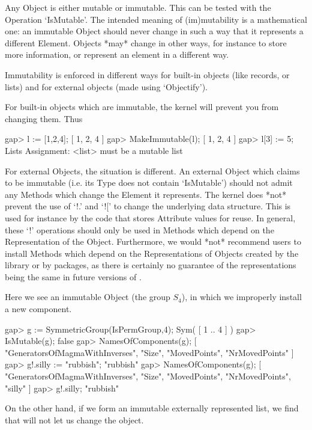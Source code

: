
Any {\GAP} Object is either mutable or immutable. This can be tested
with the Operation `IsMutable'. The intended meaning of (im)mutability
is a mathematical one:  an immutable Object should never change in
such a way that it represents a different Element. Objects *may*
change in other ways, for instance to store more information, or
represent an element in a different way.

Immutability is enforced in different ways for built-in objects (like
records, or lists) and for external objects (made using `Objectify').

For built-in objects which are immutable, the kernel will prevent
you from changing them. Thus

\beginexample
gap> l := [1,2,4];
[ 1, 2, 4 ]
gap> MakeImmutable(l);
[ 1, 2, 4 ]
gap> l[3] := 5;
Lists Assignment: <list> must be a mutable list
\endexample

For external Objects, the situation is different. An external Object which
claims to be immutable (i.e. its Type does not contain `IsMutable')
should not admit any Methods which change the Element it represents.
The kernel does *not* prevent the use of `!.' and `![' to change the
underlying data structure.
This is used for instance by the code that stores Attribute values for reuse.
In general, these `!' operations should only be used in Methods
which depend on the Representation of the Object. Furthermore, we would *not*
recommend users to install Methods which depend on the Representations of
Objects created by the library or by {\GAP} packages, as there is certainly no
guarantee of the representations being the same in future versions of {\GAP}.

Here we see an immutable Object (the group $S_4$), in which we improperly
install a new component.

\beginexample
gap> g := SymmetricGroup(IsPermGroup,4);
Sym( [ 1 .. 4 ] )
gap> IsMutable(g);
false
gap> NamesOfComponents(g);
[ "GeneratorsOfMagmaWithInverses", "Size", "MovedPoints", "NrMovedPoints" ]
gap> g!.silly := "rubbish";
"rubbish"
gap> NamesOfComponents(g);
[ "GeneratorsOfMagmaWithInverses", "Size", "MovedPoints", "NrMovedPoints", 
  "silly" ]
gap> g!.silly;
"rubbish"
\endexample

On the other hand, if we form an immutable externally represented list, we
find that {\GAP} will not let us change the object.

